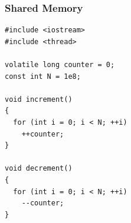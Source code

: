 \documentclass{beamer}
\begin{document}





\begin{frame}[fragile]
\frametitle{Shared Memory}
\scriptsize
\begin{lstlisting}[linebackgroundcolor={\lstcolorlines{4,10,16}}]
#include <iostream>
#include <thread>

volatile long counter = 0;
const int N = 1e8;

void increment()
{
  for (int i = 0; i < N; ++i)
    ++counter;
}

void decrement()
{
  for (int i = 0; i < N; ++i)
    --counter;
}
\end{lstlisting}

\end{frame}
\end{document}
